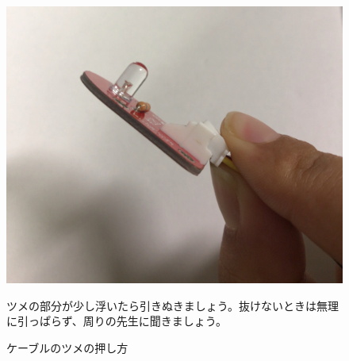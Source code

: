 \begin{enumerate}
\begin{figure}[H]
\begin{minipage}[t]{0.45\columnwidth}
      \centering
      \includegraphics[width=.8\hsize]{images/chap05/text05-img011.jpg}
      \caption{ケーブルのツメの押し方}
      ツメの部分が少し浮いたら引きぬきましょう。抜けないときは無理に引っぱらず、周りの先生に聞きましょう。
    \end{minipage}
  \end{figure}
  \end{enumerate}


\begin{tcolorbox}[title=\useOmetoi]
\begin{enumerate}
\end{enumerate}
\end{tcolorbox}















